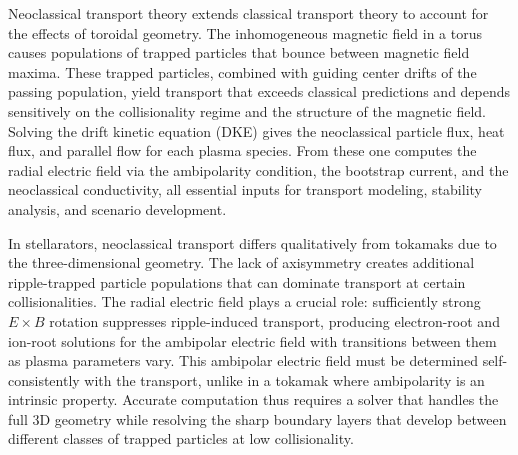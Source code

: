 \documentclass[11pt]{article}
\begin{document}
Neoclassical transport theory extends classical transport theory to account for
the effects of toroidal geometry. The inhomogeneous magnetic
field in a torus causes populations of trapped
particles that bounce between magnetic field maxima. These trapped particles,
combined with guiding center drifts of the passing population, yield transport
that exceeds classical predictions and depends sensitively on the
collisionality regime and the structure of the magnetic field. Solving the
drift kinetic equation (DKE) gives the neoclassical particle flux, heat flux,
and parallel flow for each plasma species. From these one computes the radial
electric field via the ambipolarity condition, the bootstrap current, and the
neoclassical conductivity, all essential inputs for transport modeling,
stability analysis, and scenario development.

In stellarators, neoclassical transport differs qualitatively from tokamaks
due to the three-dimensional geometry. The lack of axisymmetry creates
additional ripple-trapped particle populations that can dominate transport at
certain collisionalities. The radial electric field plays a crucial role:
sufficiently strong $E\times B$ rotation suppresses ripple-induced transport,
producing electron-root and ion-root solutions for the ambipolar electric
field with transitions between them as plasma parameters vary. This ambipolar
electric field must be determined self-consistently with the transport, unlike
in a tokamak where ambipolarity is an intrinsic property. Accurate
computation thus requires a solver that handles the full 3D geometry while
resolving the sharp boundary layers that develop between different classes of
trapped particles at low collisionality.
\end{document}
